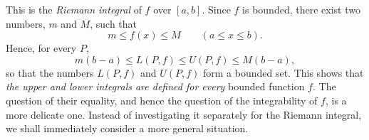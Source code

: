 \documentclass[../poma-notes.tex]{subfiles}
\begin{document}
\begin{definition}
  This is the \textit{Riemann integral} of $f$ over $[a,b]$. Since $f$ is bounded, there exist two numbers,
  $m$ and $M$, such that
  \[
    m \le f(x) \le M \qquad (a \le x \le b).
  \]
  Hence, for every $P$,
  \[
    m(b-a) \le L(P, f) \le U(P, f) \le M(b-a),
  \]
  so that the numbers $L(P, f)$ and $U(P, f)$ form a bounded set. This shows that \textit{the upper and lower
    integrals are defined for every} bounded function $f$. The question of their equality, and hence the question
  of the integrability of $f$, is a more delicate one. Instead of investigating it separately for the Riemann
  integral, we shall immediately consider a more general situation.
\end{definition}
\end{document}
